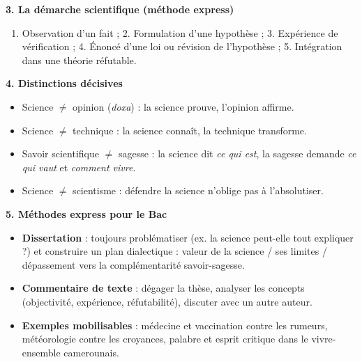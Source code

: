 \documentclass[11pt]{article}
\begin{document}
\begin{bilan}
\textbf{3. La démarche scientifique (méthode express)}
\begin{enumerate}
  \item Observation d'un fait ; 2. Formulation d'une hypothèse ; 3. Expérience de vérification ; 4. Énoncé d'une loi ou révision de l'hypothèse ; 5. Intégration dans une théorie réfutable.
\end{enumerate}

\textbf{4. Distinctions décisives}
\begin{itemize}
  \item Science $\neq$ opinion (\emph{doxa}) : la science prouve, l'opinion affirme.
  \item Science $\neq$ technique : la science connaît, la technique transforme.
  \item Savoir scientifique $\neq$ sagesse : la science dit \emph{ce qui est}, la sagesse demande \emph{ce qui vaut} et \emph{comment vivre}.
  \item Science $\neq$ scientisme : défendre la science n'oblige pas à l'absolutiser.
\end{itemize}

\textbf{5. Méthodes express pour le Bac}
\begin{itemize}
  \item \textbf{Dissertation} : toujours problématiser (ex. la science peut-elle tout expliquer ?) et construire un plan dialectique : valeur de la science / ses limites / dépassement vers la complémentarité savoir-sagesse.
  \item \textbf{Commentaire de texte} : dégager la thèse, analyser les concepts (objectivité, expérience, réfutabilité), discuter avec un autre auteur.
  \item \textbf{Exemples mobilisables} : médecine et vaccination contre les rumeurs, météorologie contre les croyances, palabre et esprit critique dans le vivre-ensemble camerounais.
\end{itemize}
\end{bilan}
\end{document}
